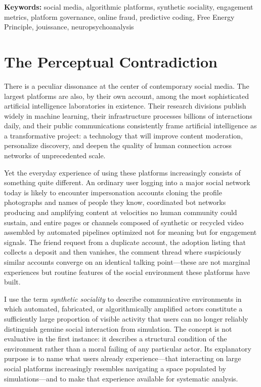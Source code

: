 \documentclass[12pt,a4paper]{article}
\begin{document}
\vspace{1em}
\noindent\textbf{Keywords:} social media, algorithmic platforms, synthetic sociality, engagement
metrics, platform governance, online fraud, predictive coding, Free Energy Principle, jouissance,
neuropsychoanalysis

\newpage

\section{The Perceptual Contradiction}

There is a peculiar dissonance at the center of contemporary social media. The largest platforms
are also, by their own account, among the most sophisticated artificial intelligence laboratories
in existence. Their research divisions publish widely in machine learning, their infrastructure
processes billions of interactions daily, and their public communications consistently frame
artificial intelligence as a transformative project: a technology that will improve content
moderation, personalize discovery, and deepen the quality of human connection across networks of
unprecedented scale.

Yet the everyday experience of using these platforms increasingly consists of something quite
different. An ordinary user logging into a major social network today is likely to encounter
impersonation accounts cloning the profile photographs and names of people they know, coordinated
bot networks producing and amplifying content at velocities no human community could sustain, and
entire pages or channels composed of synthetic or recycled video assembled by automated pipelines
optimized not for meaning but for engagement signals. The friend request from a duplicate account,
the adoption listing that collects a deposit and then vanishes, the comment thread where suspiciously
similar accounts converge on an identical talking point---these are not marginal experiences but
routine features of the social environment these platforms have built.

I use the term \emph{synthetic sociality} to describe communicative environments in which
automated, fabricated, or algorithmically amplified actors constitute a sufficiently large
proportion of visible activity that users can no longer reliably distinguish genuine social
interaction from simulation. The concept is not evaluative in the first instance: it describes
a structural condition of the environment rather than a moral failing of any particular actor.
Its explanatory purpose is to name what users already experience---that interacting on large
social platforms increasingly resembles navigating a space populated by simulations---and to
make that experience available for systematic analysis.
\end{document}
